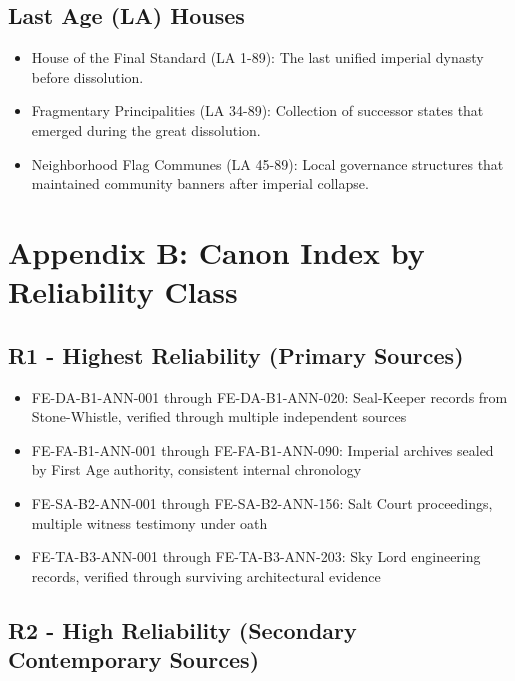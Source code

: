 \subsection{Last Age (LA) Houses}\label{last-age-la-houses}

\begin{itemize}
\tightlist
\item
  House of the Final Standard (LA 1-89): The last unified imperial
  dynasty before dissolution.
\item
  Fragmentary Principalities (LA 34-89): Collection of successor states
  that emerged during the great dissolution.
\item
  Neighborhood Flag Communes (LA 45-89): Local governance structures
  that maintained community banners after imperial collapse.
\end{itemize}

\section{Appendix B: Canon Index by Reliability
Class}\label{appendix-b-canon-index-by-reliability-class}

\subsection{R1 - Highest Reliability (Primary
Sources)}\label{r1---highest-reliability-primary-sources}

\begin{itemize}
\tightlist
\item
  FE-DA-B1-ANN-001 through FE-DA-B1-ANN-020: Seal-Keeper records from
  Stone-Whistle, verified through multiple independent sources
\item
  FE-FA-B1-ANN-001 through FE-FA-B1-ANN-090: Imperial archives sealed by
  First Age authority, consistent internal chronology
\item
  FE-SA-B2-ANN-001 through FE-SA-B2-ANN-156: Salt Court proceedings,
  multiple witness testimony under oath
\item
  FE-TA-B3-ANN-001 through FE-TA-B3-ANN-203: Sky Lord engineering
  records, verified through surviving architectural evidence
\end{itemize}

\subsection{R2 - High Reliability (Secondary Contemporary
Sources)}\label{r2---high-reliability-secondary-contemporary-sources}

